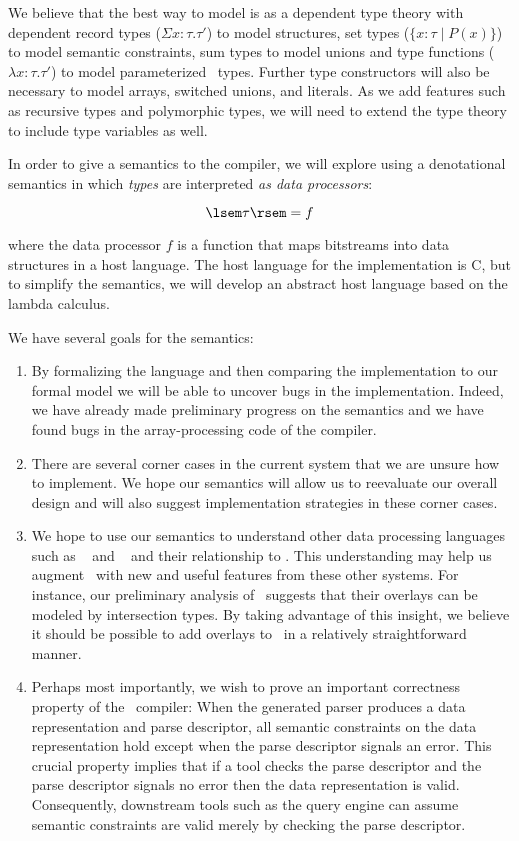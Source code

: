 \documentclass[11pt]{article}
\begin{document}
We believe that the best way to model \pads{} is as a dependent
type theory with dependent record types ($\Sigma x{:}\tau.\tau'$) to model
\pads{} structures, set types ($\{x{:}\tau \; | \; P(x) \}$) to model
semantic constraints, sum types to model unions and type functions
($\lambda x{:}\tau.\tau'$) to model parameterized \pads{}\ types.  Further
type constructors will also be necessary to model arrays, switched unions,
and literals.  As we add features such as recursive types and 
polymorphic types, we will need to extend the type theory to include
type variables as well.

In order to give a semantics to the \pads{} compiler, we will explore using
a denotational semantics in which {\em types} are interpreted 
{\em as data processors}:

\[
\lsem \tau \rsem = f
\]

\noindent
where the data processor $f$ is a function that maps bitstreams into 
data structures in a host language.  The host language for the
implementation is C, but to simplify the semantics, we will 
develop an abstract host language based on the lambda calculus.

We have several goals for the semantics:  

\begin{enumerate}
\item By formalizing the language and then comparing the implementation to our
formal model we will be able to uncover bugs in the implementation.
Indeed, we have already made preliminary progress on the semantics and we have
found bugs in the array-processing code of the compiler.  
\item There are several corner cases in the current system 
that we are unsure how to implement.  We hope our semantics
will allow us to reevaluate our overall design
and will also suggest implementation strategies in these 
corner cases.
\item We hope to use our semantics to understand other data
processing languages such as
\packettypes{}~\cite{sigcomm00} and
\datascript{}~\cite{gpce02} and their relationship to
\pads{}.  This understanding may help us augment \pads{}\ with new
and useful features from these other systems.  For instance,
our preliminary analysis of \packettypes{}\ suggests that their
overlays can be modeled by intersection types.  By taking advantage of this 
insight, we believe it should be possible to add overlays to \pads{}\ 
in a relatively straightforward manner.
\item Perhaps most importantly, we wish to prove an important
correctness property of the \pads{}\ compiler:  When the generated parser
produces a data representation and parse descriptor, all semantic 
constraints on the data representation hold except when the parse 
descriptor signals an error.  This crucial property implies that
if a tool checks the parse descriptor and the parse descriptor
signals no error then the data representation is valid.  Consequently,
downstream tools such as the query engine can assume semantic constraints
are valid merely by checking the parse descriptor.
\end{enumerate}
\end{document}

